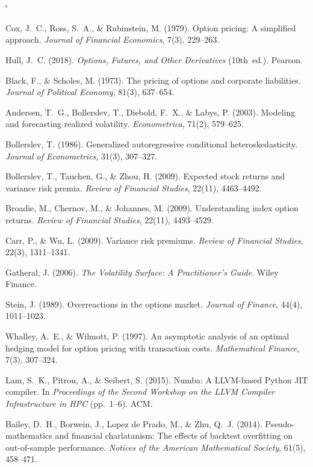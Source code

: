 \documentclass[10pt,twocolumn]{article}
\makeatletter
\renewenvironment{thebibliography}[1]{%
  \section{\refname}%
  \@mkboth{\MakeUppercase\refname}{\MakeUppercase\refname}%
  \list{\@biblabel{\@arabic\c@enumiv}}{%
    \settowidth\labelwidth{\@biblabel{#1}}%
    \leftmargin\labelwidth
    \advance\leftmargin\labelsep
    \@openbib@code
    \usecounter{enumiv}%
    \let\p@enumiv\@empty
    \renewcommand\theenumiv{\@arabic\c@enumiv}}%
  \sloppy
  \clubpenalty4000
  \@clubpenalty\clubpenalty
  \widowpenalty4000%
  \sfcode`\.\@m}{%
  \def\@noitemerr{\@latex@warning{Empty `thebibliography' environment}}%
  \endlist}
\makeatother
\begin{document}
\begin{thebibliography}{99}

Cox, J.~C., Ross, S.~A., \& Rubinstein, M. (1979).
Option pricing: A simplified approach.
\textit{Journal of Financial Economics}, 7(3), 229--263.

Hull, J.~C. (2018).
\textit{Options, Futures, and Other Derivatives} (10th~ed.).
Pearson.

Black, F., \& Scholes, M. (1973).
The pricing of options and corporate liabilities.
\textit{Journal of Political Economy}, 81(3), 637--654.

Andersen, T.~G., Bollerslev, T., Diebold, F.~X., \& Labys, P. (2003).
Modeling and forecasting realized volatility.
\textit{Econometrica}, 71(2), 579--625.

Bollerslev, T. (1986).
Generalized autoregressive conditional heteroskedasticity.
\textit{Journal of Econometrics}, 31(3), 307--327.

Bollerslev, T., Tauchen, G., \& Zhou, H. (2009).
Expected stock returns and variance risk premia.
\textit{Review of Financial Studies}, 22(11), 4463--4492.

Broadie, M., Chernov, M., \& Johannes, M. (2009).
Understanding index option returns.
\textit{Review of Financial Studies}, 22(11), 4493--4529.

Carr, P., \& Wu, L. (2009).
Variance risk premiums.
\textit{Review of Financial Studies}, 22(3), 1311--1341.

Gatheral, J. (2006).
\textit{The Volatility Surface: A Practitioner's Guide}.
Wiley Finance.

Stein, J. (1989).
Overreactions in the options market.
\textit{Journal of Finance}, 44(4), 1011--1023.

Whalley, A.~E., \& Wilmott, P. (1997).
An asymptotic analysis of an optimal hedging model for option pricing
with transaction costs.
\textit{Mathematical Finance}, 7(3), 307--324.

Lam, S.~K., Pitrou, A., \& Seibert, S. (2015).
Numba: A LLVM-based Python JIT compiler.
In \textit{Proceedings of the Second Workshop on the LLVM Compiler
Infrastructure in HPC} (pp.~1--6). ACM.

Bailey, D.~H., Borwein, J., Lopez de Prado, M., \& Zhu, Q.~J. (2014).
Pseudo-mathematics and financial charlatanism: The effects of
backtest overfitting on out-of-sample performance.
\textit{Notices of the American Mathematical Society}, 61(5), 458--471.


\end{thebibliography}
\end{document}
